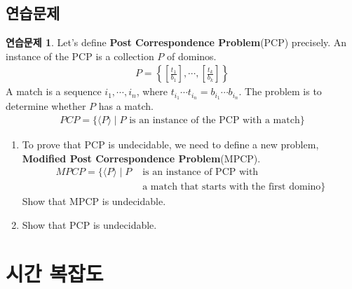 \documentclass[b5paper]{book}
\theoremstyle{definition}
\newtheorem{ec}{연습문제}[chapter]
\begin{document}
\section{연습문제}
\begin{ec}
    Let's define \textbf{Post Correspondence Problem}(PCP) precisely.
        An instance of the PCP is a collection $P$ of dominos.
    \begin{align*}
        P = \left\{\left[ \frac{t_1}{b_1} \right], \cdots ,\left[\frac{t_k}{b_k}\right] \right\}
    \end{align*}
    A match is a sequence $i_1, \cdots , i_n$, where $t_{i_1} \cdots t_{i_n} = b_{i_1} \cdots b_{i_n} $. 
    The problem is to determine whether $P$ has a match. 
    \begin{align*}
        PCP = \{ \langle P \rangle \;\vert\; P \text{ is an instance of the PCP with a match}\}
    \end{align*}
    \begin{enumerate}
        \item     
        To prove that PCP is undecidable, we need to define a new problem, 
        \textbf{Modified Post Correspondence Problem}(MPCP). 
        \begin{align*}
            MPCP = \{\langle P \rangle \; \vert \; P &\text{ is an instance of PCP with} 
            \\ & \text{ a match that starts with the first domino} \}
        \end{align*}
        Show that MPCP is undecidable.
        \item Show that PCP is undecidable.
    \end{enumerate}
\end{ec}
\chapter{시간 복잡도}
\end{document}
